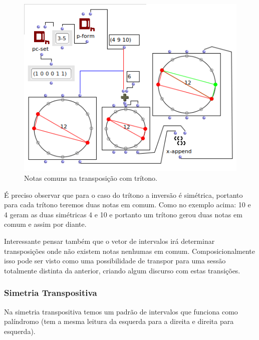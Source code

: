 \documentclass[
	12pt,				%
	openright,			%
	twoside,			%
	a4paper,			%
	english,			%
	french,				%
	spanish,			%
	brazil				%
	]{abntex2}
\begin{document}
\begin{figure}[!h]
	\caption{\label{fig_grafico}Notas comuns na transposição com trítono. }
	\begin{center}
	    \includegraphics[scale=0.7]{OM_settheory/notas_comuns_tritono.png}
	\end{center}
\end{figure}

É preciso observar que para o caso do trítono a inversão é simétrica, portanto para cada trítono teremos duas notas em comum. Como no exemplo acima: 10 e 4 geram as duas simétricas 4 e 10 e portanto um trítono gerou duas notas em comum e assim por diante.

Interessante pensar também que o vetor de intervalos irá determinar transposições onde não existem notas nenhumas em comum. Composicionalmente isso pode ser visto como uma possibilidade de transpor para uma sessão totalmente distinta da anterior, criando algum discurso com estas transições.


\subsubsection{Simetria Transpositiva}

Na simetria transpositiva temos um padrão de intervalos que funciona como palíndromo (tem a mesma leitura da esquerda para a direita e direita para esquerda).
\end{document}
